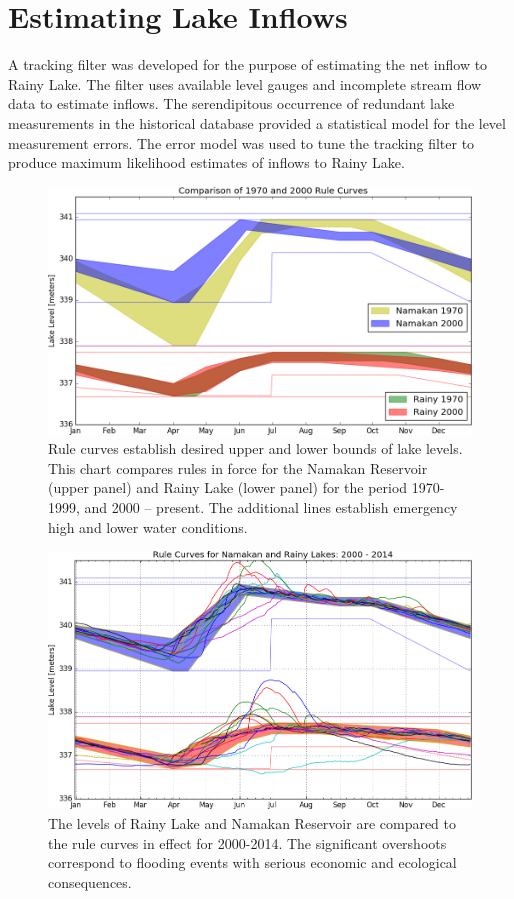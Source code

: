 \documentclass[preprint,times]{elsarticle}
\begin{document}
\section{Estimating Lake Inflows}

A tracking filter was developed for the purpose of estimating the net inflow to Rainy Lake. The filter uses available level gauges and incomplete stream flow data to estimate inflows. The serendipitous occurrence of redundant lake measurements in the historical database provided a statistical model for the level measurement errors. The error model was used to tune the tracking filter to produce maximum likelihood estimates of inflows to Rainy Lake. 

\begin{figure}
\includegraphics[width=\linewidth]{RuleCurveComparison.png}
\caption{Rule curves establish desired upper and lower bounds of lake levels. This chart compares rules in force for the Namakan Reservoir (upper panel) and Rainy Lake (lower panel) for the period 1970-1999, and 2000 -- present. The additional lines establish emergency high and lower water conditions.} \label{figure:3}
\end{figure}

\begin{figure}
\includegraphics[width=\linewidth]{RuleCurvePerformance2000-2014}
\caption{The levels of Rainy Lake and Namakan Reservoir are compared to the rule curves in effect for 2000-2014. The significant overshoots correspond to flooding events with serious economic and ecological consequences.}\label{figure:4}
\end{figure}
\end{document}
